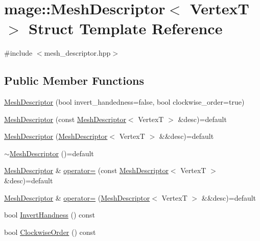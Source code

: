 \hypertarget{structmage_1_1_mesh_descriptor}{}\section{mage\+:\+:Mesh\+Descriptor$<$ VertexT $>$ Struct Template Reference}
\label{structmage_1_1_mesh_descriptor}


{\ttfamily \#include $<$mesh\+\_\+descriptor.\+hpp$>$}

\subsection*{Public Member Functions}
\begin{DoxyCompactItemize}
\item 
\hyperlink{structmage_1_1_mesh_descriptor_ae9c4651675fc0600fca01f0614c70762}{Mesh\+Descriptor} (bool invert\+\_\+handedness=false, bool clockwise\+\_\+order=true)
\item 
\hyperlink{structmage_1_1_mesh_descriptor_ab6347b2a60fbdf11573ddfe9283616d4}{Mesh\+Descriptor} (const \hyperlink{structmage_1_1_mesh_descriptor}{Mesh\+Descriptor}$<$ VertexT $>$ \&desc)=default
\item 
\hyperlink{structmage_1_1_mesh_descriptor_a62de61d0ea1ad1a514246f40e21c9faa}{Mesh\+Descriptor} (\hyperlink{structmage_1_1_mesh_descriptor}{Mesh\+Descriptor}$<$ VertexT $>$ \&\&desc)=default
\item 
\hyperlink{structmage_1_1_mesh_descriptor_adca32db164ab3032164c8dfe17af3db4}{$\sim$\+Mesh\+Descriptor} ()=default
\item 
\hyperlink{structmage_1_1_mesh_descriptor}{Mesh\+Descriptor} \& \hyperlink{structmage_1_1_mesh_descriptor_aef6a9568a8d4516dbeff4d8f665ca213}{operator=} (const \hyperlink{structmage_1_1_mesh_descriptor}{Mesh\+Descriptor}$<$ VertexT $>$ \&desc)=default
\item 
\hyperlink{structmage_1_1_mesh_descriptor}{Mesh\+Descriptor} \& \hyperlink{structmage_1_1_mesh_descriptor_aee596eaa945924860d9a26daa58d8f45}{operator=} (\hyperlink{structmage_1_1_mesh_descriptor}{Mesh\+Descriptor}$<$ VertexT $>$ \&\&desc)=default
\item 
bool \hyperlink{structmage_1_1_mesh_descriptor_a7f63b926282683dcb0f674eca0901f5e}{Invert\+Handness} () const
\item 
bool \hyperlink{structmage_1_1_mesh_descriptor_ab81b000d93242ae002227010c4a9446c}{Clockwise\+Order} () const
\end{DoxyCompactItemize}
